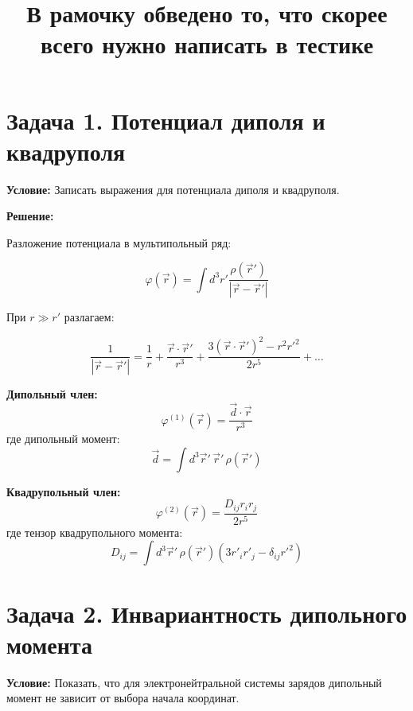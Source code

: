 \documentclass[12pt,a4paper]{article}
\title{\textbf{В рамочку обведено то, что скорее всего нужно написать в тестике}}
\author{}
\date{}
\begin{document}
\maketitle

\section*{Задача 1. Потенциал диполя и квадруполя}

\textbf{Условие:} Записать выражения для потенциала диполя и квадруполя.

\textbf{Решение:}

Разложение потенциала в мультипольный ряд:

\begin{equation}
\varphi(\vec{r}) = \int d^3r' \frac{\rho(\vec{r}')}{|\vec{r} - \vec{r}'|}
\end{equation}

При $r \gg r'$ разлагаем:

\begin{equation}
\frac{1}{|\vec{r} - \vec{r}'|} = \frac{1}{r} + \frac{\vec{r} \cdot \vec{r}'}{r^3} + \frac{3(\vec{r} \cdot \vec{r}')^2 - r^2 r'^2}{2r^5} + \ldots
\end{equation}

\textbf{Дипольный член:}
\begin{equation}
\boxed{\varphi^{(1)}(\vec{r}) = \frac{\vec{d} \cdot \vec{r}}{r^3}}
\end{equation}
где дипольный момент:
\begin{equation}
\boxed{\vec{d} = \int d^3\vec{r}' \, \vec{r}' \, \rho(\vec{r}')}
\end{equation}

\textbf{Квадрупольный член:}
\begin{equation}
\boxed{\varphi^{(2)}(\vec{r}) = \frac{D_{ij} r_i r_j}{2r^5}}
\end{equation}
где тензор квадрупольного момента:
\begin{equation}
\boxed{D_{ij} = \int d^3\vec{r}' \, \rho(\vec{r}') \left(3r'_i r'_j - \delta_{ij} r'^2\right)}
\end{equation}

\section*{Задача 2. Инвариантность дипольного момента}

\textbf{Условие:} Показать, что для электронейтральной системы зарядов дипольный момент не зависит от выбора начала координат.
\end{document}
